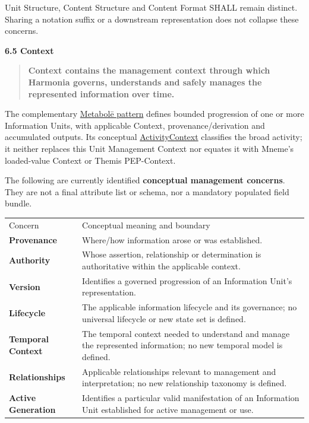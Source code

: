 Unit Structure, Content Structure and Content Format SHALL remain distinct.
Sharing a notation suffix or a downstream representation does not collapse
these concerns.



\par\medskip\textbf{6.5 Context}\par


\begin{quote}


\textbf{Context contains the management context through which Harmonia governs, understands and safely manages the represented information over time.}



\end{quote}


The complementary \href{\detokenize{../../../../../../../../docs/markdown/04-information-architecture/patterns/metabole.md}}{Metabolē pattern} defines bounded
progression of one or more Information Units, with applicable Context,
provenance/derivation and accumulated outputs. Its conceptual
\hyperref[element:c34b4929f71946708d37dbe6c1da920a]{ActivityContext}
classifies the broad activity; it neither replaces this Unit Management Context
nor equates it with Mneme's loaded-value Context or Themis PEP-Context.



The following are currently identified \textbf{conceptual management concerns}. They
are not a final attribute list or schema, nor a mandatory populated field bundle.



\begin{longtable}{>{\raggedright\arraybackslash}p{}>{\raggedright\arraybackslash}p{}}
Concern & Conceptual meaning and boundary \\
\textbf{Provenance} & Where/how information arose or was established. \\
\textbf{Authority} & Whose assertion, relationship or determination is authoritative within the applicable context. \\
\textbf{Version} & Identifies a governed progression of an Information Unit's representation. \\
\textbf{Lifecycle} & The applicable information lifecycle and its governance; no universal lifecycle or new state set is defined. \\
\textbf{Temporal Context} & The temporal context needed to understand and manage the represented information; no new temporal model is defined. \\
\textbf{Relationships} & Applicable relationships relevant to management and interpretation; no new relationship taxonomy is defined. \\
\textbf{Active Generation} & Identifies a particular valid manifestation of an Information Unit established for active management or use. \\
\end{longtable}


